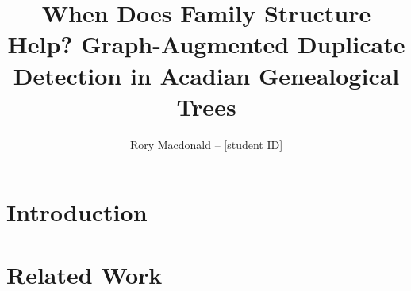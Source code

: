 \documentclass[10pt,journal,compsoc]{IEEEtran}
\begin{document}
\title{When Does Family Structure Help? Graph-Augmented Duplicate Detection in Acadian Genealogical Trees}


\author{Rory Macdonald -- [student ID]

}



\IEEEtitleabstractindextext{%


}


\maketitle


\IEEEdisplaynontitleabstractindextext



%
\IEEEpeerreviewmaketitle



\section{Introduction}\label{sec:introduction}


\section{Related Work}\label{sec:related}

\end{document}
